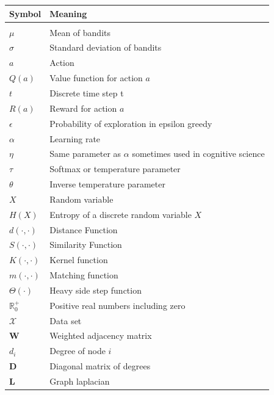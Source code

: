 \documentclass[12pt,a4paper,bibliography=totocnumbered,listof=totocnumbered]{scrartcl}
\begin{document}
\begin{tabular}{p{6cm}p{9cm}}
\textbf{Symbol} 		& 		\textbf{Meaning} \\
\midrule
\vspace{0.3cm} & \vspace{0.3cm} 			\\
$\mu$ & Mean of bandits \\
$\sigma$ & Standard deviation of bandits \\
$a$				  & Action 	\\
$Q(a)$	& Value function for action $a$\\
$t$ & Discrete time step t \\
$R(a)$ & Reward for action $a$ \\
$\epsilon$			& Probability of exploration in epsilon greedy \\
$\alpha$ & Learning rate \\ 
$\eta$ & Same parameter as $\alpha$ sometimes used in cognitive science\\
$\tau$ & Softmax or temperature parameter \\
$\theta$ & Inverse temperature parameter \\
$X$ & Random variable \\
$H(X) $ &  Entropy of a  discrete random variable $X$ \\ 
$d(\cdot,\cdot)$ & Distance Function \\
$S(\cdot,\cdot)$ & Similarity Function \\
$K(\cdot,\cdot)$ & Kernel function \\
$m(\cdot,\cdot)$ & Matching function \\ 
$\Theta(\cdot)$ & Heavy side step function \\
$ \mathbb{R}_0^+$ & Positive real numbers including zero \\
$\mathcal{X}$ & Data set \\ 
\textbf{W} & Weighted adjacency matrix \\
$d_i$ & Degree of node $i$ \\
\textbf{D} & Diagonal matrix of degrees \\
\textbf{L} & Graph laplacian \\
\end{tabular}

\pagebreak

\end{document}
